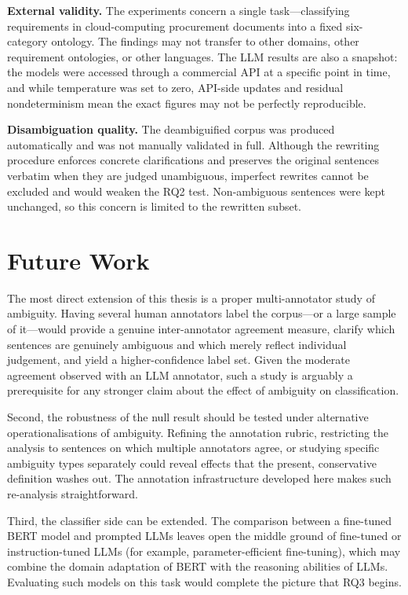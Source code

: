\textbf{External validity.} The experiments concern a single task---classifying requirements in cloud-computing procurement documents into a fixed six-category ontology. The findings may not transfer to other domains, other requirement ontologies, or other languages. The LLM results are also a snapshot: the models were accessed through a commercial API at a specific point in time, and while temperature was set to zero, API-side updates and residual nondeterminism mean the exact figures may not be perfectly reproducible.

\textbf{Disambiguation quality.} The deambiguified corpus was produced automatically and was not manually validated in full. Although the rewriting procedure enforces concrete clarifications and preserves the original sentences verbatim when they are judged unambiguous, imperfect rewrites cannot be excluded and would weaken the RQ2 test. Non-ambiguous sentences were kept unchanged, so this concern is limited to the rewritten subset.

\section{Future Work}

The most direct extension of this thesis is a proper multi-annotator study of ambiguity. Having several human annotators label the corpus---or a large sample of it---would provide a genuine inter-annotator agreement measure, clarify which sentences are genuinely ambiguous and which merely reflect individual judgement, and yield a higher-confidence label set. Given the moderate agreement observed with an LLM annotator, such a study is arguably a prerequisite for any stronger claim about the effect of ambiguity on classification.

Second, the robustness of the null result should be tested under alternative operationalisations of ambiguity. Refining the annotation rubric, restricting the analysis to sentences on which multiple annotators agree, or studying specific ambiguity types separately could reveal effects that the present, conservative definition washes out. The annotation infrastructure developed here makes such re-analysis straightforward.

Third, the classifier side can be extended. The comparison between a fine-tuned BERT model and prompted LLMs leaves open the middle ground of fine-tuned or instruction-tuned LLMs (for example, parameter-efficient fine-tuning), which may combine the domain adaptation of BERT with the reasoning abilities of LLMs. Evaluating such models on this task would complete the picture that RQ3 begins.

